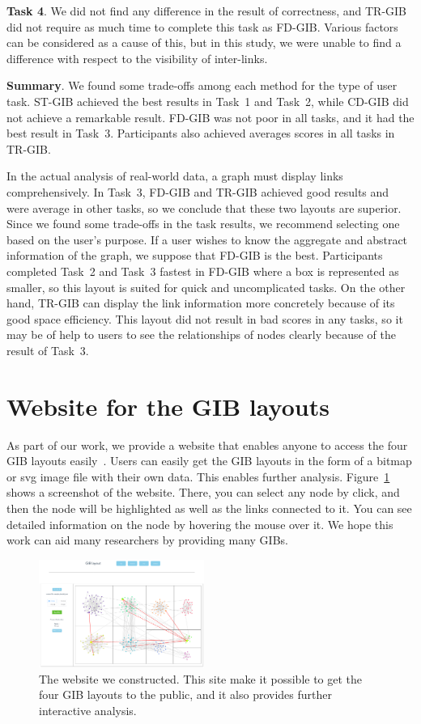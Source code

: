 \documentclass[review]{vgtc}                 %
\begin{document}
{\bf Task 4}. We did not find any difference in the result of correctness, and TR-GIB did not require as much time to complete this task as FD-GIB.
Various factors can be considered as a cause of this, but in this study, we were unable to find a difference with respect to the visibility of inter-links.

{\bf Summary}. We found some trade-offs among each method for the type of user task.
ST-GIB achieved the best results in Task~1 and Task~2, while CD-GIB did not achieve a remarkable result.
FD-GIB was not poor in all tasks, and it had the best result in Task~3.
Participants also achieved averages scores in all tasks in TR-GIB.

In the actual analysis of real-world data, a graph must display links comprehensively.
In Task~3, FD-GIB and TR-GIB achieved good results and were average in other tasks, so we conclude that these two layouts are superior.
Since we found some trade-offs in the task results, we recommend selecting one based on the user's purpose.
If a user wishes to know the aggregate and abstract information of the graph, we suppose that FD-GIB is the best.
Participants completed Task~2 and Task~3 fastest in FD-GIB where a box is represented as smaller, so this layout is suited for quick and uncomplicated tasks.
On the other hand, TR-GIB can display the link information more concretely because of its good space efficiency.
This layout did not result in bad scores in any tasks, so it may be of help to users to see the relationships of nodes clearly because of the result of Task~3.


\section{Website for the GIB layouts}
As part of our work, we provide a website that enables anyone to access the four GIB layouts easily~\cite{gibweb}.
Users can easily get the GIB layouts in the form of a bitmap or svg image file with their own data.
This enables further analysis.
Figure~\ref{website} shows a screenshot of the website.
There, you can select any node by click, and then the node will be highlighted as well as the links connected to it.
You can see detailed information on the node by hovering the mouse over it.
We hope this work can aid many researchers by providing many GIBs.

\begin{figure}
  \begin{center}
    \includegraphics[width=0.48\textwidth]{pictures/website.png}
    \caption{The website we constructed. This site make it possible to get the four GIB layouts to the public, and it also provides further interactive analysis.}
    \label{website}
  \end{center}
\end{figure}
\end{document}
